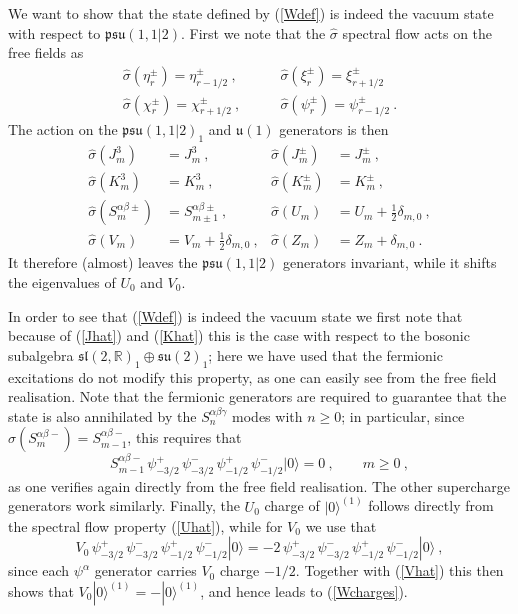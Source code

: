 \documentclass[a4paper,11pt]{article}
\numberwithin{equation}{section}
\def\be{\begin{equation}}
\def\ee{\end{equation}}
\begin{document}
We want to show that the state defined by (\ref{Wdef}) is indeed the vacuum state with 
respect to $\mathfrak{psu}(1,1|2)$. First we note that the $\hat{\sigma}$ spectral flow acts 
 on the free fields as 
\begin{align}
\hat{\sigma} (\eta^\pm_r) = \eta^\pm_{r-1/2} \ , \qquad & \hat{\sigma} (\xi^\pm_r) = \xi^\pm_{r+1/2}  \\
\hat{\sigma} (\chi^\pm_r) = \chi^\pm_{r+1/2} \ , \qquad & \hat{\sigma} (\psi^\pm_r) = \psi^\pm_{r-1/2} \ . 
\end{align}
The action on the $\mathfrak{psu}(1,1|2)_1$ and $\mathfrak{u}(1)$ generators is then
\begin{subequations}
\begin{align}
\hat \sigma(J^3_m) & = J^3_m  \ , & \hat \sigma(J^\pm_m) &= J^{\pm}_{m} \ , \label{Jhat} \\
\hat \sigma(K^3_m) & = K^3_m \ , & \hat \sigma(K^\pm_m) &= K^{\pm}_{m} \ , \label{Khat} \\
\hat \sigma(S^{\alpha \beta \pm}_m) & = S^{\alpha \beta \pm}_{m \pm 1} \ , & \hat \sigma(U_m) &= U_m + \tfrac{1}{2}\delta_{m,0} \ , \label{Uhat}\\
\hat \sigma(V_m) & = V_m + \tfrac{1}{2} \delta_{m,0} \ , & \hat \sigma(Z_m) & = Z_m + \delta_{m,0} \ . \label{Vhat}
\end{align}
\end{subequations}
It therefore (almost) leaves the $\mathfrak{psu}(1,1|2)$ generators invariant, while it shifts the eigenvalues of $U_0$ and $V_0$. 

In order to see that (\ref{Wdef}) is indeed the vacuum state we first note that because of (\ref{Jhat}) and (\ref{Khat}) this is the case with respect to the bosonic subalgebra $\mathfrak{sl}(2,\mathbb{R})_1\oplus\mathfrak{su}(2)_1$; here we have used that the fermionic excitations do not modify this property, as one can easily see from the free field realisation. Note that the fermionic generators are required to guarantee that the state is also annihilated by the $S^{\alpha\beta\gamma}_n$ modes with $n\geq 0$; in particular, since $\hat \sigma(S^{\alpha \beta -}_m) = S^{\alpha \beta -}_{m-1}$, this requires that 
\be
S^{\alpha \beta -}_{m-1} \, \psi^+_{-3/2} \, \psi^-_{-3/2} \,  \psi^+_{-1/2} \,  \psi^-_{-1/2} |0\rangle  = 0 \ , \qquad m\geq 0  \ ,
\ee
as one verifies again directly from the free field realisation. The other supercharge generators work similarly. Finally, the $U_0$ charge of $|0\rangle^{(1)}$ follows directly from the spectral flow property (\ref{Uhat}), while for $V_0$ we use that 
\be
V_0 \, \psi^+_{-3/2} \, \psi^-_{-3/2} \,  \psi^+_{-1/2} \,  \psi^-_{-1/2} |0\rangle  = - 2 \, \psi^+_{-3/2} \, \psi^-_{-3/2} \,  \psi^+_{-1/2} \,  \psi^-_{-1/2} |0\rangle \ , 
\ee
since each $\psi^\alpha$ generator carries $V_0$ charge $-1/2$. Together with (\ref{Vhat}) this then shows that $V_0 |0\rangle^{(1)} = - |0\rangle^{(1)}$, and hence leads to (\ref{Wcharges}).
\end{document}
